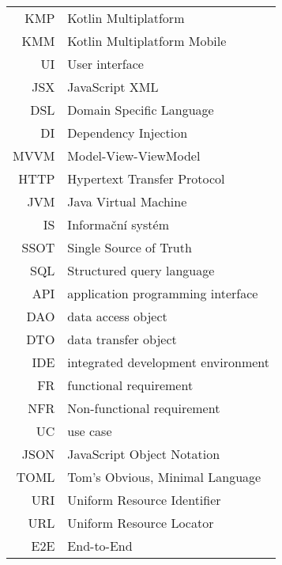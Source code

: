 \documentclass[czech,master,unicode,oneside]{ctufit-thesis}
\theoremstyle{plain}
\theoremstyle{definition}
\theoremstyle{remark}
\numberwithin{theorem}{chapter}
\begin{document}
\begin{tabular}{rl}
KMP & Kotlin Multiplatform\\
KMM & Kotlin Multiplatform Mobile\\
UI & User interface\\
JSX & JavaScript XML\\
DSL & Domain Specific Language\\
DI & Dependency Injection\\
MVVM & Model-View-ViewModel\\
HTTP & Hypertext Transfer Protocol\\
JVM & Java Virtual Machine\\
IS & Informační systém\\
SSOT & Single Source of Truth\\
SQL & Structured query language\\
API &application programming interface\\
DAO &data access object\\
DTO &data transfer object\\
IDE &integrated development environment\\
FR &functional requirement\\
NFR &Non-functional requirement\\
UC &use case\\
JSON &JavaScript Object Notation\\
TOML &Tom's Obvious, Minimal Language\\
URI &Uniform Resource Identifier\\
URL &Uniform Resource Locator\\
E2E & End-to-End\\




\end{tabular}

\mainmatter\mainmatterinit %



\appendix\appendixinit %


\backmatter %

\printbibliography %

\end{document}
